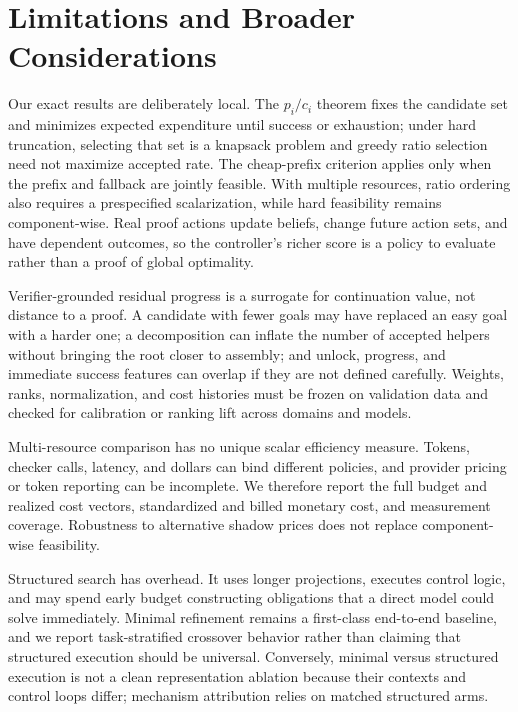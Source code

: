\section{Limitations and Broader Considerations}

Our exact results are deliberately local. The \(p_i/c_i\) theorem fixes the
candidate set and minimizes expected expenditure until success or exhaustion;
under hard truncation, selecting that set is a knapsack problem and greedy
ratio selection need not maximize accepted rate. The cheap-prefix criterion
applies only when the prefix and fallback are jointly feasible. With multiple
resources, ratio ordering also requires a prespecified scalarization, while
hard feasibility remains component-wise. Real proof actions update beliefs,
change future action sets, and have dependent outcomes, so the controller's
richer score is a policy to evaluate rather than a proof of global optimality.

Verifier-grounded residual progress is a surrogate for continuation value, not
distance to a proof. A candidate with fewer goals may have replaced an easy
goal with a harder one; a decomposition can inflate the number of accepted
helpers without bringing the root closer to assembly; and unlock, progress,
and immediate success features can overlap if they are not defined carefully.
Weights, ranks, normalization, and cost histories must be frozen on validation
data and checked for calibration or ranking lift across domains and models.

Multi-resource comparison has no unique scalar efficiency measure. Tokens,
checker calls, latency, and dollars can bind different policies, and provider
pricing or token reporting can be incomplete. We therefore report the full
budget and realized cost vectors, standardized and billed monetary cost, and
measurement coverage. Robustness to alternative shadow prices does not replace
component-wise feasibility.

Structured search has overhead. It uses longer projections, executes control
logic, and may spend early budget constructing obligations that a direct model
could solve immediately. Minimal refinement remains a first-class end-to-end
baseline, and we report task-stratified crossover behavior rather than claiming
that structured execution should be universal. Conversely, minimal versus
structured execution is not a clean representation ablation because their
contexts and control loops differ; mechanism attribution relies on matched
structured arms.

